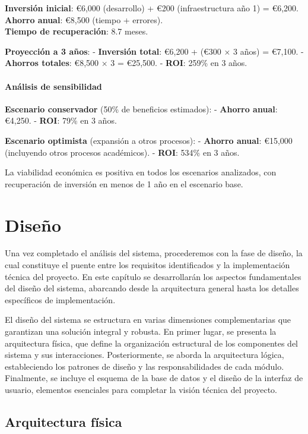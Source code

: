 \documentclass[12pt,a4paper,oneside]{report}
\begin{document}
\textbf{Inversión inicial}: €6,000 (desarrollo) + €200 (infraestructura
año 1) = €6,200.\\
\textbf{Ahorro anual}: €8,500 (tiempo + errores).\\
\textbf{Tiempo de recuperación}: 8.7 meses.

\textbf{Proyección a 3 años}: - \textbf{Inversión total}: €6,200 + (€300
× 3 años) = €7,100. - \textbf{Ahorros totales}: €8,500 × 3 = €25,500. -
\textbf{ROI}: 259\% en 3 años.

\subsubsection{Análisis de
sensibilidad}\label{anuxe1lisis-de-sensibilidad}

\textbf{Escenario conservador} (50\% de beneficios estimados): -
\textbf{Ahorro anual}: €4,250. - \textbf{ROI}: 79\% en 3 años.

\textbf{Escenario optimista} (expansión a otros procesos): -
\textbf{Ahorro anual}: €15,000 (incluyendo otros procesos académicos). -
\textbf{ROI}: 534\% en 3 años.

La viabilidad económica es positiva en todos los escenarios analizados,
con recuperación de inversión en menos de 1 año en el escenario base.

\chapter{Diseño}\label{diseuxf1o}

Una vez completado el análisis del sistema, procederemos con la fase de
diseño, la cual constituye el puente entre los requisitos identificados
y la implementación técnica del proyecto. En este capítulo se
desarrollarán los aspectos fundamentales del diseño del sistema,
abarcando desde la arquitectura general hasta los detalles específicos
de implementación.

El diseño del sistema se estructura en varias dimensiones
complementarias que garantizan una solución integral y robusta. En
primer lugar, se presenta la arquitectura física, que define la
organización estructural de los componentes del sistema y sus
interacciones. Posteriormente, se aborda la arquitectura lógica,
estableciendo los patrones de diseño y las responsabilidades de cada
módulo. Finalmente, se incluye el esquema de la base de datos y el
diseño de la interfaz de usuario, elementos esenciales para completar la
visión técnica del proyecto.

\section{Arquitectura física}\label{arquitectura-fuxedsica}
\end{document}
